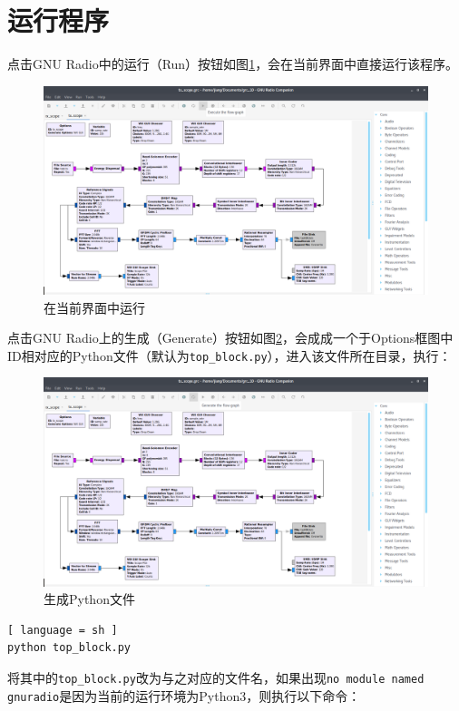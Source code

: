 	\section{运行程序}
		\par 点击GNU Radio中的运行（Run）按钮如图\ref{fig:dvbt_run}，会在当前界面中直接运行该程序。
		\begin{figure}[htp]
			\centering
			\includegraphics[width=13cm]{figures/dvbt_run.png}
			\caption{在当前界面中运行}
			\label{fig:dvbt_run}
		\end{figure}
		\par 点击GNU Radio上的生成（Generate）按钮如图\ref{fig:dvbt_generate}，会成成一个于Options框图中ID相对应的Python文件（默认为\lstinline[language=sh]{top_block.py}），进入该文件所在目录，执行：
		\begin{figure}[htp]
			\centering
			\includegraphics[width=13cm]{figures/dvbt_generate.png}
			\caption{生成Python文件}
			\label{fig:dvbt_generate}
		\end{figure}	
		\begin{lstlisting}[ language = sh ]
python top_block.py
		\end{lstlisting}
		\par 将其中的\lstinline[language=sh]{top_block.py}改为与之对应的文件名，如果出现\lstinline[language=sh]{no module named gnuradio}是因为当前的运行环境为Python3，则执行以下命令：

